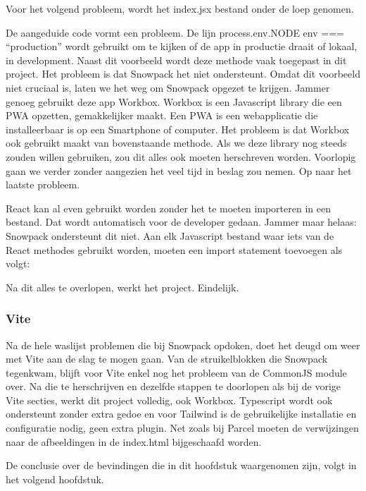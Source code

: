     Voor het volgend probleem, wordt het index.jsx bestand onder de loep genomen.

    

    De aangeduide code vormt een probleem. De lijn process.env.NODE env === “production” wordt gebruikt om te kijken of de app in productie draait of lokaal, in development. Naast dit voorbeeld wordt deze methode vaak toegepast in dit project. Het probleem is dat Snowpack het niet ondersteunt. Omdat dit voorbeeld niet cruciaal is, laten we het weg om Snowpack opgezet te krijgen. Jammer genoeg gebruikt deze app Workbox. Workbox is een Javascript library die een PWA opzetten, gemakkelijker maakt. Een PWA is een webapplicatie die installeerbaar is op een Smartphone of computer. Het probleem is dat Workbox ook gebruikt maakt van bovenstaande methode. Als we deze library nog steeds zouden willen gebruiken, zou dit alles ook moeten herschreven worden. Voorlopig gaan we verder zonder aangezien het veel tijd in beslag zou nemen. Op naar het laatste probleem.

    React kan al even gebruikt worden zonder het te moeten importeren in een bestand. Dat wordt automatisch voor de developer gedaan. Jammer maar helaas: Snowpack ondersteunt dit niet. Aan elk Javascript bestand waar iets van de React methodes gebruikt worden, moeten een import statement toevoegen als volgt:

    

    Na dit alles te overlopen, werkt het project. Eindelijk.

\subsubsection{Vite}
Na de hele waslijst problemen die bij Snowpack opdoken, doet het deugd om weer met Vite aan de slag te mogen gaan. Van de struikelblokken die Snowpack tegenkwam, blijft voor Vite enkel nog het probleem van de CommonJS module over. Na die te herschrijven en dezelfde stappen te doorlopen als bij de vorige Vite secties, werkt dit project volledig, ook Workbox. Typescript wordt ook ondersteunt zonder extra gedoe en voor Tailwind is de gebruikelijke installatie en configuratie nodig, geen extra plugin. Net zoals bij Parcel moeten de verwijzingen naar de afbeeldingen in de index.html bijgeschaafd worden. 

De conclusie over de bevindingen die in dit hoofdstuk waargenomen zijn, volgt in het volgend hoofdstuk. 
